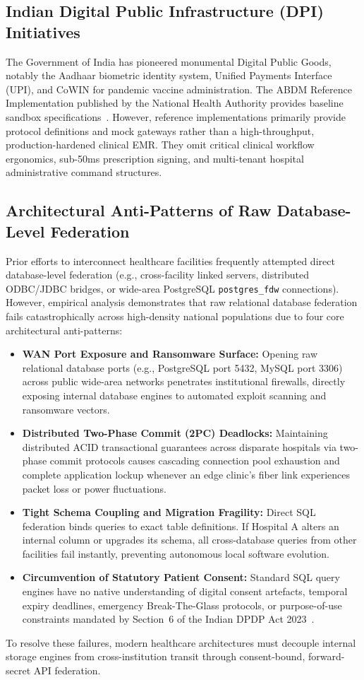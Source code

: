 \documentclass[journal,twocolumn]{IEEEtran}
\begin{document}
\subsection{Indian Digital Public Infrastructure (DPI) Initiatives}
The Government of India has pioneered monumental Digital Public Goods, notably the Aadhaar biometric identity system, Unified Payments Interface (UPI), and CoWIN for pandemic vaccine administration. The ABDM Reference Implementation published by the National Health Authority provides baseline sandbox specifications~\cite{nha_abdm_2023}. However, reference implementations primarily provide protocol definitions and mock gateways rather than a high-throughput, production-hardened clinical EMR. They omit critical clinical workflow ergonomics, sub-50ms prescription signing, and multi-tenant hospital administrative command structures.

\subsection{Architectural Anti-Patterns of Raw Database-Level Federation}
Prior efforts to interconnect healthcare facilities frequently attempted direct database-level federation (e.g., cross-facility linked servers, distributed ODBC/JDBC bridges, or wide-area PostgreSQL \texttt{postgres\_fdw} connections). However, empirical analysis demonstrates that raw relational database federation fails catastrophically across high-density national populations due to four core architectural anti-patterns:
\begin{itemize}
    \item \textbf{WAN Port Exposure and Ransomware Surface:} Opening raw relational database ports (e.g., PostgreSQL port 5432, MySQL port 3306) across public wide-area networks penetrates institutional firewalls, directly exposing internal database engines to automated exploit scanning and ransomware vectors.
    \item \textbf{Distributed Two-Phase Commit (2PC) Deadlocks:} Maintaining distributed ACID transactional guarantees across disparate hospitals via two-phase commit protocols causes cascading connection pool exhaustion and complete application lockup whenever an edge clinic's fiber link experiences packet loss or power fluctuations.
    \item \textbf{Tight Schema Coupling and Migration Fragility:} Direct SQL federation binds queries to exact table definitions. If Hospital A alters an internal column or upgrades its schema, all cross-database queries from other facilities fail instantly, preventing autonomous local software evolution.
    \item \textbf{Circumvention of Statutory Patient Consent:} Standard SQL query engines have no native understanding of digital consent artefacts, temporal expiry deadlines, emergency Break-The-Glass protocols, or purpose-of-use constraints mandated by Section~6 of the Indian DPDP Act 2023~\cite{dpdp_act_2023}.
\end{itemize}
To resolve these failures, modern healthcare architectures must decouple internal storage engines from cross-institution transit through consent-bound, forward-secret API federation.
\end{document}
